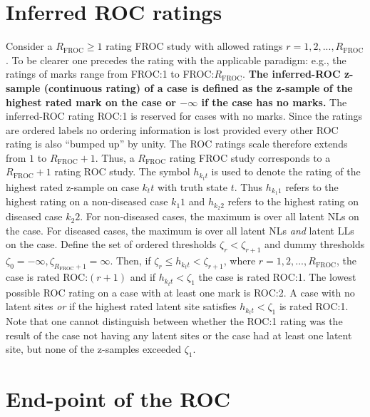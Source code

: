 \documentclass[
]{book}
\begin{document}
\hypertarget{rsm-pred-inferred-roc}{%
\section{Inferred ROC ratings}\label{rsm-pred-inferred-roc}}

Consider a \(R_{\text{FROC}} \geq 1\) rating FROC study with allowed ratings \(r = 1, 2, ..., R_{\text{FROC}}\). To be clearer one precedes the rating with the applicable paradigm: e.g., the ratings of marks range from FROC:1 to FROC:\(R_{\text{FROC}}\). \textbf{The inferred-ROC z-sample (continuous rating) of a case is defined as the z-sample of the highest rated mark on the case or \(-\infty\) if the case has no marks.} The inferred-ROC rating ROC:1 is reserved for cases with no marks. Since the ratings are ordered labels no ordering information is lost provided every other ROC rating is also ``bumped up'' by unity. The ROC ratings scale therefore extends from \(1\) to \(R_{\text{FROC}} + 1\). Thus, a \(R_{\text{FROC}}\) rating FROC study corresponds to a \(R_{\text{FROC}} + 1\) rating ROC study. The symbol \(h_{k_t t}\) is used to denote the rating of the highest rated z-sample on case \(k_t t\) with truth state \(t\). Thus \(h_{k_1 1}\) refers to the highest rating on a non-diseased case \(k_1 1\) and \(h_{k_2 2}\) refers to the highest rating on diseased case \(k_2 2\). For non-diseased cases, the maximum is over all latent NLs on the case. For diseased cases, the maximum is over all latent NLs \emph{and} latent LLs on the case. Define the set of ordered thresholds \(\zeta_r < \zeta_{r+1}\) and dummy thresholds \(\zeta_0 = -\infty, \zeta_{R_{\text{FROC}}+1} = \infty\). Then, if \(\zeta_r \leq h_{k_t t} < \zeta_{r+1}\), where \(r = 1, 2, ..., R_{\text{FROC}}\), the case is rated ROC:\((r+1)\) and if \(h_{k_t t} < \zeta_{1}\) the case is rated ROC:1. The lowest possible ROC rating on a case with at least one mark is ROC:2. A case with no latent sites \emph{or} if the highest rated latent site satisfies \(h_{k_t t} < \zeta_{1}\) is rated ROC:1. Note that one cannot distinguish between whether the ROC:1 rating was the result of the case not having any latent sites or the case had at least one latent site, but none of the z-samples exceeded \(\zeta_{1}\).

\hypertarget{rsm-pred-end-point}{%
\section{End-point of the ROC}\label{rsm-pred-end-point}}
\end{document}
